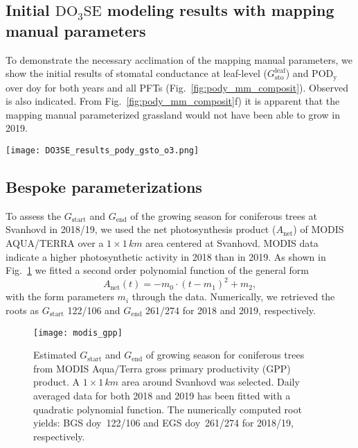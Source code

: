\documentclass[bg, manuscript]{copernicus}
\begin{document}
\subsection{Initial $\mathrm{DO_3SE}$ modeling results with mapping manual parameters}
To demonstrate the necessary acclimation of the mapping manual parameters, we show the initial results of stomatal conductance at leaf-level ($G_\mathrm{sto}^\mathrm{leaf}$) and $\mathrm{POD_y}$ over \unit{doy} for both years and all PFTs (Fig.~\ref{fig:pody_mm_composit}). Observed \chem{[O_3]} is also indicated. From Fig.~\ref{fig:pody_mm_composit}f) it is apparent that the mapping manual parameterized grassland would not have been able to grow in 2019.

\begin{figure*}[t]
  \texttt{[image: DO3SE\_results\_pody\_gsto\_o3.png]}
  \caption{$\mathrm{DO_3SE}$ modeling results for mapping manual default parameterization. $\mathrm{POD_y}$ is shown over \unit{doy}, March--October. A flux threshold $y=1\,\unit{nmol\,m^{-2}\,s^{-1}}$ per projected leaf area (PLA) has been chosen. \chem{[O_3]} are plotted on the same axis and scales as $G_\text{sto}^\text{leaf}$ but in units of $\unit{ppb}$. (a, b) deciduous tree; (c, d) coniferous tree; (e, f) perennial grassland. From left to right: 2018, 2019.}
  \label{fig:pody_mm_composit}
\end{figure*}

\subsection{Bespoke parameterizations}

To assess the $G_\mathrm{start}$  and $G_\mathrm{end}$ of the growing season for coniferous trees at Svanhovd in 2018/19, we used the net photosynthesis product ($A_\mathrm{net}$) of MODIS AQUA/TERRA over a $1\times 1\,\unit{km}$ area centered at Svanhovd. MODIS data indicate a higher photosynthetic activity in 2018 than in 2019. As shown in Fig.~\ref{fig:modis_gpp} we fitted a second order polynomial function of the general form
%
\begin{equation}
A_\mathrm{net}(t) =  -m_0\cdot(t-m_1)^2+m_2,
\end{equation}
%
with the form parameters $m_i$ through the data. Numerically, we retrieved the roots as $G_\mathrm{start}$ 122/106 and $G_\mathrm{end}$ 261/274 for 2018 and 2019, respectively. 

\begin{figure}[th]
  \texttt{[image: modis\_gpp]}
  \caption{Estimated $G_\mathrm{start}$ and $G_\mathrm{end}$ of growing season for coniferous trees from MODIS Aqua/Terra gross primary productivity (GPP) product. A $1\times 1\,\unit{km}$ area around Svanhovd was selected. Daily averaged data for both 2018 and 2019 has been fitted with a quadratic polynomial function. The numerically computed root yields: BGS \unit{doy}~122/106 and EGS \unit{doy}~261/274 for 2018/19, respectively.}
  \label{fig:modis_gpp}
\end{figure}
\end{document}

